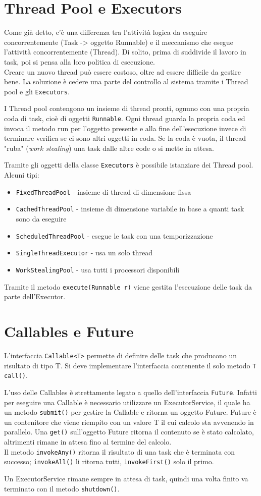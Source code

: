 \section{Thread Pool e Executors}
Come già detto, c'è una differenza tra l'attività logica da eseguire concorrentemente (Task -> oggetto Runnable) e il meccanismo che esegue l'attività concorrentemente (Thread). Di solito, prima di suddivide il lavoro in task, poi si pensa alla loro politica di esecuzione. \\
Creare un nuovo thread può essere costoso, oltre ad essere difficile da gestire bene. La soluzione è cedere una parte del controllo al sistema tramite i Thread pool e gli \texttt{Executors}.

I Thread pool contengono un insieme di thread pronti, ognuno con una propria coda di task, cioè di oggetti \texttt{Runnable}. Ogni thread guarda la propria coda ed invoca il metodo run per l'oggetto presente e alla fine dell'esecuzione invece di terminare verifica se ci sono altri oggetti in coda. Se la coda è vuota, il thread "ruba" (\textit{work stealing}) una task dalle altre code o si mette in attesa.

Tramite gli oggetti della classe \texttt{Executors} è possibile istanziare dei Thread pool. Alcuni tipi:
\begin{itemize}
\item \texttt{FixedThreadPool} - insieme di thread di dimensione fissa
\item \texttt{CachedThreadPool} - insieme di dimensione variabile in base a quanti task sono da eseguire
\item \texttt{ScheduledThreadPool} - esegue le task con una temporizzazione
\item \texttt{SingleThreadExecutor} - usa un solo thread
\item \texttt{WorkStealingPool} - usa tutti i processori disponibili
\end{itemize}
Tramite il metodo \texttt{execute(Runnable r)} viene gestita l'esecuzione delle task da parte dell'Executor.

\section{Callables e Future}
L'interfaccia \texttt{Callable<T>} permette di definire delle task che producono un risultato di tipo T. Si deve implementare l'interfaccia contenente il solo metodo \texttt{T call()}.

L'uso delle Callables è strettamente legato a quello dell'interfaccia \texttt{Future}. Infatti per eseguire una Callable è necessario utilizzare un ExecutorService, il quale ha un metodo \texttt{submit()} per gestire la Callable e ritorna un oggetto Future. Future è un contenitore che viene riempito con un valore T il cui calcolo sta avvenendo in parallelo. Una \texttt{get()} sull'oggetto Future ritorna il contenuto se è stato calcolato, altrimenti rimane in attesa fino al termine del calcolo. \\
Il metodo \texttt{invokeAny()} ritorna il risultato di una task che è terminata con successo; \texttt{invokeAll()} li ritorna tutti, \texttt{invokeFirst()} solo il primo.

Un ExecutorService rimane sempre in attesa di task, quindi una volta finito va terminato con il metodo \texttt{shutdown()}.
